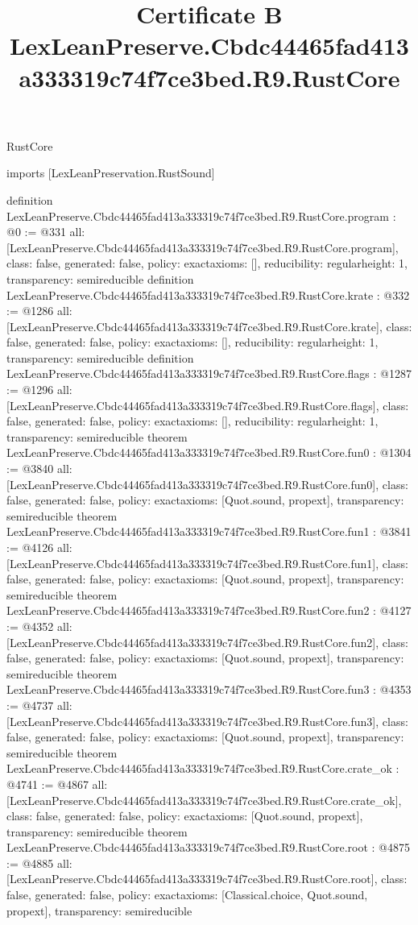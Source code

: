 \begin{lexlean}{RustCore}
\title{Certificate B LexLeanPreserve.Cbdc44465fad413a333319c74f7ce3bed.R9.RustCore}
\begin{coremodule}
imports [LexLeanPreservation.RustSound]

definition LexLeanPreserve.Cbdc44465fad413a333319c74f7ce3bed.R9.RustCore.program : @0 := @331 {
  all: [LexLeanPreserve.Cbdc44465fad413a333319c74f7ce3bed.R9.RustCore.program],
  class: false,
  generated: false,
  policy: exact{axioms: []},
  reducibility: regular{height: 1},
  transparency: semireducible
}
definition LexLeanPreserve.Cbdc44465fad413a333319c74f7ce3bed.R9.RustCore.krate : @332 := @1286 {
  all: [LexLeanPreserve.Cbdc44465fad413a333319c74f7ce3bed.R9.RustCore.krate],
  class: false,
  generated: false,
  policy: exact{axioms: []},
  reducibility: regular{height: 1},
  transparency: semireducible
}
definition LexLeanPreserve.Cbdc44465fad413a333319c74f7ce3bed.R9.RustCore.flags : @1287 := @1296 {
  all: [LexLeanPreserve.Cbdc44465fad413a333319c74f7ce3bed.R9.RustCore.flags],
  class: false,
  generated: false,
  policy: exact{axioms: []},
  reducibility: regular{height: 1},
  transparency: semireducible
}
theorem LexLeanPreserve.Cbdc44465fad413a333319c74f7ce3bed.R9.RustCore.fun0 : @1304 := @3840 {
  all: [LexLeanPreserve.Cbdc44465fad413a333319c74f7ce3bed.R9.RustCore.fun0],
  class: false,
  generated: false,
  policy: exact{axioms: [Quot.sound, propext]},
  transparency: semireducible
}
theorem LexLeanPreserve.Cbdc44465fad413a333319c74f7ce3bed.R9.RustCore.fun1 : @3841 := @4126 {
  all: [LexLeanPreserve.Cbdc44465fad413a333319c74f7ce3bed.R9.RustCore.fun1],
  class: false,
  generated: false,
  policy: exact{axioms: [Quot.sound, propext]},
  transparency: semireducible
}
theorem LexLeanPreserve.Cbdc44465fad413a333319c74f7ce3bed.R9.RustCore.fun2 : @4127 := @4352 {
  all: [LexLeanPreserve.Cbdc44465fad413a333319c74f7ce3bed.R9.RustCore.fun2],
  class: false,
  generated: false,
  policy: exact{axioms: [Quot.sound, propext]},
  transparency: semireducible
}
theorem LexLeanPreserve.Cbdc44465fad413a333319c74f7ce3bed.R9.RustCore.fun3 : @4353 := @4737 {
  all: [LexLeanPreserve.Cbdc44465fad413a333319c74f7ce3bed.R9.RustCore.fun3],
  class: false,
  generated: false,
  policy: exact{axioms: [Quot.sound, propext]},
  transparency: semireducible
}
theorem LexLeanPreserve.Cbdc44465fad413a333319c74f7ce3bed.R9.RustCore.crate_ok : @4741 := @4867 {
  all: [LexLeanPreserve.Cbdc44465fad413a333319c74f7ce3bed.R9.RustCore.crate_ok],
  class: false,
  generated: false,
  policy: exact{axioms: [Quot.sound, propext]},
  transparency: semireducible
}
theorem LexLeanPreserve.Cbdc44465fad413a333319c74f7ce3bed.R9.RustCore.root : @4875 := @4885 {
  all: [LexLeanPreserve.Cbdc44465fad413a333319c74f7ce3bed.R9.RustCore.root],
  class: false,
  generated: false,
  policy: exact{axioms: [Classical.choice, Quot.sound, propext]},
  transparency: semireducible
}


\end{coremodule}
\end{lexlean}
